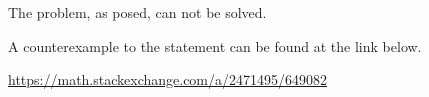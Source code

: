 The problem, as posed, can not be solved.

A counterexample to the statement can be found at the link below.

\url{https://math.stackexchange.com/a/2471495/649082}